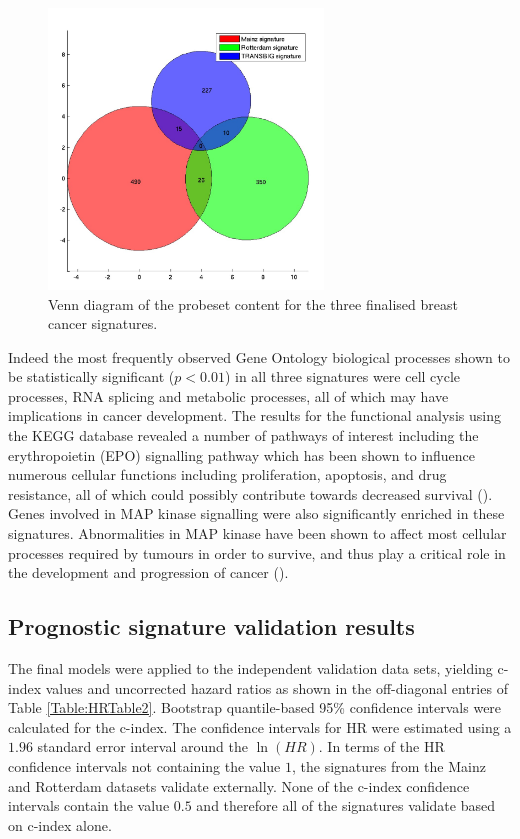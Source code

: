 \documentclass[letterpaper,12pt]{article}
\begin{document}
\begin{figure}[!th]
\centering
\includegraphics[width=0.65\textwidth]{Figures/SignatureOverlapVenn.jpeg}
\caption{Venn diagram of the probeset content for the three finalised breast cancer signatures.}
\label{Fig:Venn3}
\end{figure}

Indeed the most frequently observed Gene Ontology biological processes shown to be statistically significant ($p < 0.01$) in all three signatures were cell cycle processes, RNA splicing and metabolic processes, all of which may have implications in cancer development. The results for the functional analysis using the KEGG database revealed a number of pathways of interest including the erythropoietin (EPO) signalling pathway which has been shown to influence numerous cellular functions including proliferation, apoptosis, and drug resistance, all of which could possibly contribute towards decreased survival (\citet{Hedley:11}). Genes involved in MAP kinase signalling were also significantly enriched in these signatures. Abnormalities in MAP kinase have been shown to affect most cellular processes required by tumours in order to survive, and thus play a critical role in the development and progression of cancer (\citet{Dhillon:07}). 



\subsection{Prognostic signature validation results}
The final models were applied to the independent validation data sets, yielding c-index values and uncorrected hazard ratios as shown in the off-diagonal entries of Table \ref{Table:HRTable2}. Bootstrap quantile-based 95\% confidence intervals were calculated for the c-index. The confidence intervals for HR were estimated using a $1.96$ standard error interval around the $\ln(HR)$. In terms of the HR confidence intervals not containing the value $1$, the signatures from the Mainz and Rotterdam datasets validate externally. None of the c-index confidence intervals contain the value $0.5$ and therefore all of the signatures validate based on c-index alone.
\end{document}
